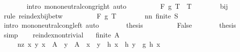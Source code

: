\begin{isabellebody}
\ \ \ \ \ \ \isamarkupfalse%
\ {\isacharparenleft}{\kern0pt}intro\ mono{\isacharunderscore}{\kern0pt}neutral{\isacharunderscore}{\kern0pt}cong{\isacharunderscore}{\kern0pt}right{\isacharparenright}{\kern0pt}\ auto\isanewline
\ \ \ \ \isamarkupfalse%
\ \isamarkupfalse%
\ {\isachardoublequoteopen}{\isasymdots}\ {\isacharequal}{\kern0pt}\ F\ g\ {\isacharparenleft}{\kern0pt}T\ {\isacharminus}{\kern0pt}\ T{\isacharprime}{\kern0pt}{\isacharparenright}{\kern0pt}{\isachardoublequoteclose}\isanewline
\ \ \ \ \ \ \isamarkupfalse%
\ bij\ \isamarkupfalse%
\ {\isacharparenleft}{\kern0pt}rule\ reindex{\isacharunderscore}{\kern0pt}bij{\isacharunderscore}{\kern0pt}betw{\isacharparenright}{\kern0pt}\isanewline
\ \ \ \ \isamarkupfalse%
\ \isamarkupfalse%
\ {\isachardoublequoteopen}{\isasymdots}\ {\isacharequal}{\kern0pt}\ F\ g\ T{\isachardoublequoteclose}\isanewline
\ \ \ \ \ \ \isamarkupfalse%
\ nn\ {\isacartoucheopen}finite\ S{\isacartoucheclose}\ \isamarkupfalse%
\ {\isacharparenleft}{\kern0pt}intro\ mono{\isacharunderscore}{\kern0pt}neutral{\isacharunderscore}{\kern0pt}cong{\isacharunderscore}{\kern0pt}left{\isacharparenright}{\kern0pt}\ auto\isanewline
\ \ \ \ \isamarkupfalse%
\ \isamarkupfalse%
\ {\isacharquery}{\kern0pt}thesis\ \isacommand{{\isachardot}{\kern0pt}}\isamarkupfalse%
\isanewline
\ \ \isamarkupfalse%
\isanewline
\ \ \ \ \isamarkupfalse%
\ False\isanewline
\ \ \ \ \isamarkupfalse%
\ \isamarkupfalse%
\ {\isacharquery}{\kern0pt}thesis\ \isamarkupfalse%
\ simp\isanewline
\ \ \isamarkupfalse%
\isanewline
{}\isamarkupfalse%
%
\endisatagproof
{\isafoldproof}%
%
\isadelimproof
\isanewline
%
\endisadelimproof
\isanewline
{}\isamarkupfalse%
\ reindex{\isacharunderscore}{\kern0pt}nontrivial{\isacharcolon}{\kern0pt}\isanewline
\ \ \ {\isachardoublequoteopen}finite\ A{\isachardoublequoteclose}\isanewline
\ \ \ \ \ nz{\isacharcolon}{\kern0pt}\ {\isachardoublequoteopen}{\isasymAnd}x\ y{\isachardot}{\kern0pt}\ x\ {\isasymin}\ A\ {\isasymLongrightarrow}\ y\ {\isasymin}\ A\ {\isasymLongrightarrow}\ x\ {\isasymnoteq}\ y\ {\isasymLongrightarrow}\ h\ x\ {\isacharequal}{\kern0pt}\ h\ y\ {\isasymLongrightarrow}\ g\ {\isacharparenleft}{\kern0pt}h\ x{\isacharparenright}{\kern0pt}\ {\isacharequal}{\kern0pt}\ \isanewline

\end{isabellebody}
